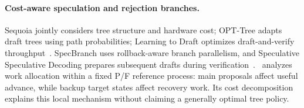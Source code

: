 \paragraph{Cost-aware speculation and rejection branches.}
Sequoia jointly considers tree structure and hardware cost; OPT-Tree adapts draft trees using path probabilities; Learning to Draft optimizes draft-and-verify throughput~\cite{sequoia,opttree,ltd}. SpecBranch uses rollback-aware branch parallelism, and Speculative Speculative Decoding prepares subsequent drafts during verification~\cite{specbranch,ssd}. \PF\ analyzes work allocation within a fixed P/F reference process: main proposals affect useful advance, while backup target states affect recovery work. Its cost decomposition explains this local mechanism without claiming a generally optimal tree policy.
